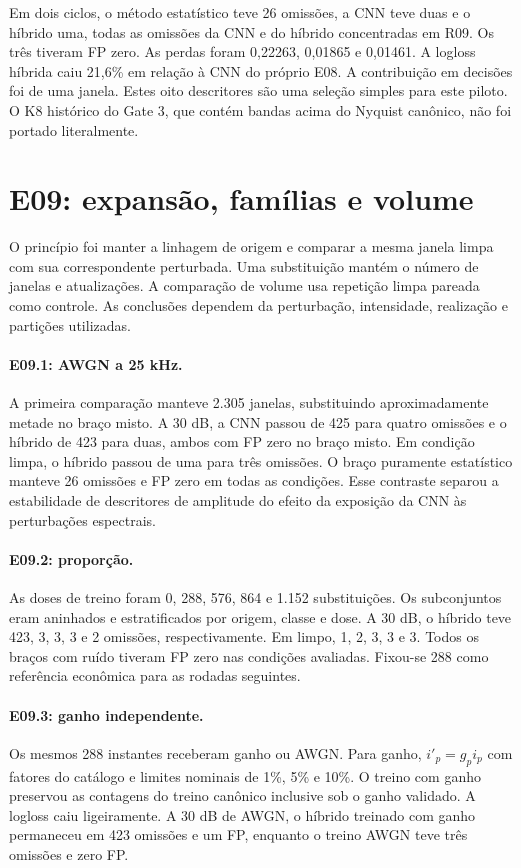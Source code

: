 \documentclass[11pt,a4paper]{article}
\begin{document}
Em dois ciclos, o método estatístico teve 26 omissões, a CNN teve duas e o híbrido uma, todas as omissões da CNN e do híbrido concentradas em R09. Os três tiveram FP zero. As perdas foram 0,22263, 0,01865 e 0,01461. A logloss híbrida caiu 21,6\% em relação à CNN do próprio E08. A contribuição em decisões foi de uma janela. Estes oito descritores são uma seleção simples para este piloto. O K8 histórico do Gate 3, que contém bandas acima do Nyquist canônico, não foi portado literalmente.

\section{E09: expansão, famílias e volume}
O princípio foi manter a linhagem de origem e comparar a mesma janela limpa com sua correspondente perturbada. Uma substituição mantém o número de janelas e atualizações. A comparação de volume usa repetição limpa pareada como controle. As conclusões dependem da perturbação, intensidade, realização e partições utilizadas.

\paragraph{E09.1: AWGN a 25 kHz.} A primeira comparação manteve 2.305 janelas, substituindo aproximadamente metade no braço misto. A 30 dB, a CNN passou de 425 para quatro omissões e o híbrido de 423 para duas, ambos com FP zero no braço misto. Em condição limpa, o híbrido passou de uma para três omissões. O braço puramente estatístico manteve 26 omissões e FP zero em todas as condições. Esse contraste separou a estabilidade de descritores de amplitude do efeito da exposição da CNN às perturbações espectrais.

\paragraph{E09.2: proporção.} As doses de treino foram 0, 288, 576, 864 e 1.152 substituições. Os subconjuntos eram aninhados e estratificados por origem, classe e dose. A 30 dB, o híbrido teve 423, 3, 3, 3 e 2 omissões, respectivamente. Em limpo, 1, 2, 3, 3 e 3. Todos os braços com ruído tiveram FP zero nas condições avaliadas. Fixou-se 288 como referência econômica para as rodadas seguintes.

\paragraph{E09.3: ganho independente.} Os mesmos 288 instantes receberam ganho ou AWGN. Para ganho, $i'_p=g_pi_p$ com fatores do catálogo e limites nominais de 1\%, 5\% e 10\%. O treino com ganho preservou as contagens do treino canônico inclusive sob o ganho validado. A logloss caiu ligeiramente. A 30 dB de AWGN, o híbrido treinado com ganho permaneceu em 423 omissões e um FP, enquanto o treino AWGN teve três omissões e zero FP.
\end{document}
